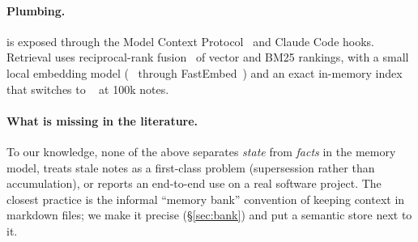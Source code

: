 \paragraph{Plumbing.} \jevmem{} is exposed through the Model Context Protocol~\cite{mcp2024} and Claude Code hooks. Retrieval uses reciprocal-rank fusion~\cite{cormack2009rrf} of vector and BM25 rankings, with a small local embedding model (~\cite{xiao2023cpack} through FastEmbed~\cite{fastembed}) and an exact in-memory index that switches to ~\cite{sqlitevec} at 100k notes.

\paragraph{What is missing in the literature.} To our knowledge, none of the above separates \emph{state} from \emph{facts} in the memory model, treats stale notes as a first-class problem (supersession rather than accumulation), or reports an end-to-end use on a real software project. The closest practice is the informal ``memory bank'' convention of keeping context in markdown files; we make it precise (\S\ref{sec:bank}) and put a semantic store next to it.
